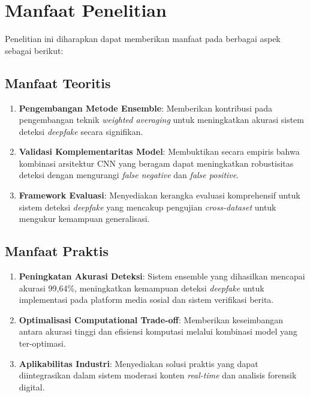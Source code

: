 \section{Manfaat Penelitian}

Penelitian ini diharapkan dapat memberikan manfaat pada berbagai aspek sebagai berikut:

\subsection{Manfaat Teoritis}
\begin{enumerate}
    \item \textbf{Pengembangan Metode Ensemble}: Memberikan kontribusi pada pengembangan teknik \textit{weighted averaging} untuk meningkatkan akurasi sistem deteksi \textit{deepfake} secara signifikan.
    
    \item \textbf{Validasi Komplementaritas Model}: Membuktikan secara empiris bahwa kombinasi arsitektur CNN yang beragam dapat meningkatkan robustisitas deteksi dengan mengurangi \textit{false negative} dan \textit{false positive}.
    
    \item \textbf{Framework Evaluasi}: Menyediakan kerangka evaluasi komprehensif untuk sistem deteksi \textit{deepfake} yang mencakup pengujian \textit{cross-dataset} untuk mengukur kemampuan generalisasi.
\end{enumerate}

\subsection{Manfaat Praktis}
\begin{enumerate}
    \item \textbf{Peningkatan Akurasi Deteksi}: Sistem ensemble yang dihasilkan mencapai akurasi 99,64\%, meningkatkan kemampuan deteksi \textit{deepfake} untuk implementasi pada platform media sosial dan sistem verifikasi berita.
    
    \item \textbf{Optimalisasi Computational Trade-off}: Memberikan keseimbangan antara akurasi tinggi dan efisiensi komputasi melalui kombinasi model yang ter-optimasi.
    
    \item \textbf{Aplikabilitas Industri}: Menyediakan solusi praktis yang dapat diintegrasikan dalam sistem moderasi konten \textit{real-time} dan analisis forensik digital.
\end{enumerate}

